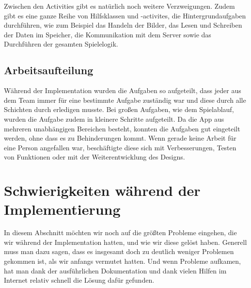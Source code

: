 Zwischen den Activities gibt es natürlich noch weitere Verzweigungen. Zudem gibt es eine ganze Reihe von Hilfsklassen und -activites, die Hintergrundaufgaben durchführen, wie zum Beispiel das Handeln der Bilder, das Lesen und Schreiben der Daten im Speicher, die Kommunikation mit dem Server sowie das Durchführen der gesamten Spielelogik.

\subsection{Arbeitsaufteilung}
\label{sec:implementierung:architektur:arbeitsaufteilung }

Während der Implementation wurden die Aufgaben so aufgeteilt, dass jeder aus dem Team immer für eine bestimmte Aufgabe zuständig war und diese durch alle Schichten durch erledigen musste. Bei großen Aufgaben, wie dem Spielablauf, wurden die Aufgabe zudem in kleinere Schritte aufgeteilt. Da die App aus mehreren unabhängigen Bereichen besteht, konnten die Aufgaben gut eingeteilt werden, ohne dass es zu Behinderungen kommt. Wenn gerade keine Arbeit für eine Person angefallen war, beschäftigte diese sich mit Verbesserungen, Testen von Funktionen oder mit der Weiterentwicklung des Designs.

\section{Schwierigkeiten während der Implementierung}
\label{sec:implementierung:schwierigkeiten }	

In diesem Abschnitt möchten wir noch auf die größten Probleme eingehen, die wir während der Implementation hatten, und wie wir diese gelöst haben. Generell muss man dazu sagen, dass es insgesamt doch zu deutlich weniger Problemen gekommen ist, als wir anfangs vermutet hatten. Und wenn Probleme aufkamen, hat man dank der ausführlichen Dokumentation und dank vielen Hilfen im Internet relativ schnell die Lösung dafür gefunden.

